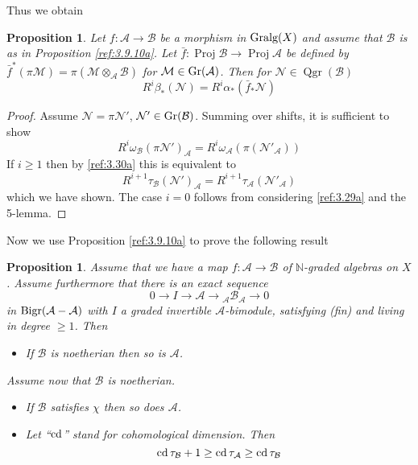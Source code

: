 \documentclass{amsproc}
\def \NN{{\mathbb N}}
\def\Ascr{{\mathcal A}}
\def\Bscr{{\mathcal B}}
\def\Mscr{{\mathcal M}}
\def\Nscr{{\mathcal N}}
\def\cd{\mathop{\text{cd}}}
\def\Gr{\mathop{\text{Gr}}}
\def\Bigr{\mathop{\text{Bigr}}}
\def\Gralg{\mathop{\text{Gralg}}}
\def\Proj{\operatorname {Proj}}
\def\Qgr{\operatorname {Qgr}}
\def\r{\rightarrow}
\let\oldtext\text
\def\text#1{\oldtext{\upshape #1}}
\newtheorem{propositions}[lemmas]{Proposition}
\theoremstyle{definition}
\theoremstyle{remark}
\numberwithin{equation}{section}
\numberwithin{table}{section}
\numberwithin{figure}{section}
\def\Gr{\mathop{\text{Gr}}}
\begin{document}
Thus we obtain 
\begin{propositions}
\label{ref:3.9.12a}
Let $f:\Ascr\r\Bscr$ be a morphism in $\Gralg(X)$ and assume that $\Bscr$ is
as in Proposition \ref{ref:3.9.10a}. Let $\bar{f}:\Proj\Bscr\r\Proj\Ascr$ be
defined by $\bar{f}^\ast(\pi\Mscr)=\pi(\Mscr\otimes_\Ascr\Bscr)$ for
$\Mscr\in\Gr(\Ascr)$. Then for $\Nscr\in\Qgr(\Bscr)$
\[
R^i\beta_\ast(\Nscr)=R^i\alpha_\ast(\bar{f}_\ast\Nscr)
\]
\end{propositions}
\begin{proof} Assume $\Nscr=\pi\Nscr'$, $\Nscr'\in\Gr(\Bscr)$. 
Summing over shifts, it is sufficient to show
\[
R^i\omega_\Bscr(\pi\Nscr')_\Ascr=R^i\omega_\Ascr(\pi(\Nscr'_\Ascr))
\]
If $i\ge 1$ then by \eqref{ref:3.30a} this is equivalent to
\[
R^{i+1}\tau_\Bscr(\Nscr')_\Ascr=R^{i+1}\tau_\Ascr(\Nscr'_\Ascr)
\]
which we have shown.
The case $i=0$ follows from considering \eqref{ref:3.29a} and the 5-lemma.
\end{proof}
Now we use Proposition \ref{ref:3.9.10a} to prove the following result
\begin{propositions}
\label{ref:3.9.13a}
Assume that we have a  map $f:\Ascr\r\Bscr$ of $\NN$-graded
algebras on $X$. Assume furthermore that there is an exact sequence
\[
0\r  I\r \Ascr\r{}_\Ascr\Bscr_\Ascr\r 0
\]
in $\Bigr(\Ascr-\Ascr)$ with $I$ a graded invertible $\Ascr$-bimodule,
satisfying (fin) and living in degree $\ge 1$. Then
\begin{itemize}
\item[1.] If $\Bscr$ is noetherian then so is $\Ascr$.
\end{itemize}
Assume now that  $\Bscr$ is noetherian.
\begin{itemize}
\item[2.] If $\Bscr$ satisfies $\chi$ then so does $\Ascr$.
\item[3.] Let ``$\cd$'' stand for cohomological dimension. Then 
\[
\cd \tau_\Bscr+1\ge \cd\tau_\Ascr \ge \cd \tau_\Bscr
\]
\end{itemize}
\end{propositions}
\end{document}

